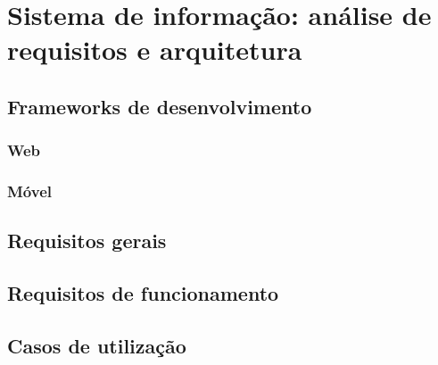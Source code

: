 \chapter{Sistema de informação: análise de requisitos e arquitetura}


\section{Frameworks de desenvolvimento}


\subsection{Web}




\subsection{Móvel}


\section{Requisitos gerais}



\section{Requisitos de funcionamento}


\section{Casos de utilização}

